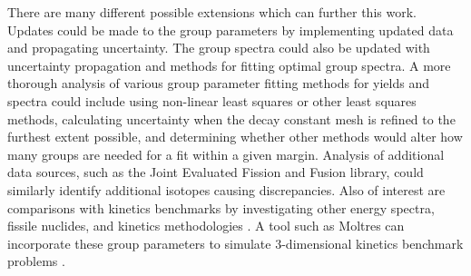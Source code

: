 \documentclass{style/nseJournal}
\begin{document}
There are many different possible extensions which can further this work.
Updates could be made to the group parameters by implementing updated data and propagating uncertainty.
The group spectra could also be updated with uncertainty propagation and methods for fitting optimal group spectra.
A more thorough analysis of various group parameter fitting methods for yields and spectra could include using non-linear least squares or other least squares methods, calculating uncertainty when the decay constant mesh is refined to the furthest extent possible, and determining whether other methods would alter how many groups are needed for a fit within a given margin.
Analysis of additional data sources, such as the Joint Evaluated Fission and Fusion library, could similarly identify additional isotopes causing discrepancies.
Also of interest are comparisons with kinetics benchmarks by investigating other energy spectra, fissile nuclides, and kinetics methodologies \cite{aboanber2013generalized, ganapol2009refined, nobrega1971new}.
A tool such as Moltres can incorporate these group parameters to simulate 3-dimensional kinetics benchmark problems \cite{lindsay_introduction_2018, park_advancements_2025, kliem1999benchmark, briggs2014overview}.



\end{document}
